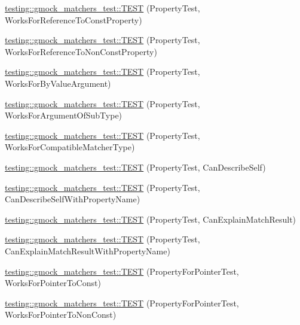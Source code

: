 \begin{DoxyCompactItemize}
\mbox{\hyperlink{namespacetesting_1_1gmock__matchers__test_a7254899c6d45df648d5b4ef6eece3ae0}{testing\+::gmock\+\_\+matchers\+\_\+test\+::\+T\+E\+ST}} (Property\+Test, Works\+For\+Reference\+To\+Const\+Property)
\item 
\mbox{\hyperlink{namespacetesting_1_1gmock__matchers__test_a5b7b02e8fcef1aff9a4afc81d5fb5d5f}{testing\+::gmock\+\_\+matchers\+\_\+test\+::\+T\+E\+ST}} (Property\+Test, Works\+For\+Reference\+To\+Non\+Const\+Property)
\item 
\mbox{\hyperlink{namespacetesting_1_1gmock__matchers__test_af703b24e2bee13cf7a042f699809a5ab}{testing\+::gmock\+\_\+matchers\+\_\+test\+::\+T\+E\+ST}} (Property\+Test, Works\+For\+By\+Value\+Argument)
\item 
\mbox{\hyperlink{namespacetesting_1_1gmock__matchers__test_a38a5ad623dda9ef0f48ebaf65485d18e}{testing\+::gmock\+\_\+matchers\+\_\+test\+::\+T\+E\+ST}} (Property\+Test, Works\+For\+Argument\+Of\+Sub\+Type)
\item 
\mbox{\hyperlink{namespacetesting_1_1gmock__matchers__test_a17b7a59d1dbca0692ebaa71e6f46f1d6}{testing\+::gmock\+\_\+matchers\+\_\+test\+::\+T\+E\+ST}} (Property\+Test, Works\+For\+Compatible\+Matcher\+Type)
\item 
\mbox{\hyperlink{namespacetesting_1_1gmock__matchers__test_a8c749e210723e33547e58fe8822fb85e}{testing\+::gmock\+\_\+matchers\+\_\+test\+::\+T\+E\+ST}} (Property\+Test, Can\+Describe\+Self)
\item 
\mbox{\hyperlink{namespacetesting_1_1gmock__matchers__test_abcfb6f5efcd420b9acfeb1e9930a8dc2}{testing\+::gmock\+\_\+matchers\+\_\+test\+::\+T\+E\+ST}} (Property\+Test, Can\+Describe\+Self\+With\+Property\+Name)
\item 
\mbox{\hyperlink{namespacetesting_1_1gmock__matchers__test_aff810d2cdd79c55d483965a28bb5069a}{testing\+::gmock\+\_\+matchers\+\_\+test\+::\+T\+E\+ST}} (Property\+Test, Can\+Explain\+Match\+Result)
\item 
\mbox{\hyperlink{namespacetesting_1_1gmock__matchers__test_acd0d13c244310aeed3eb2dacccee644e}{testing\+::gmock\+\_\+matchers\+\_\+test\+::\+T\+E\+ST}} (Property\+Test, Can\+Explain\+Match\+Result\+With\+Property\+Name)
\item 
\mbox{\hyperlink{namespacetesting_1_1gmock__matchers__test_ac9222439b8e0b1e080650d667044c140}{testing\+::gmock\+\_\+matchers\+\_\+test\+::\+T\+E\+ST}} (Property\+For\+Pointer\+Test, Works\+For\+Pointer\+To\+Const)
\item 
\mbox{\hyperlink{namespacetesting_1_1gmock__matchers__test_acc639f3cbeacf4af712bf02ac451b160}{testing\+::gmock\+\_\+matchers\+\_\+test\+::\+T\+E\+ST}} (Property\+For\+Pointer\+Test, Works\+For\+Pointer\+To\+Non\+Const)

\end{DoxyCompactItemize}
